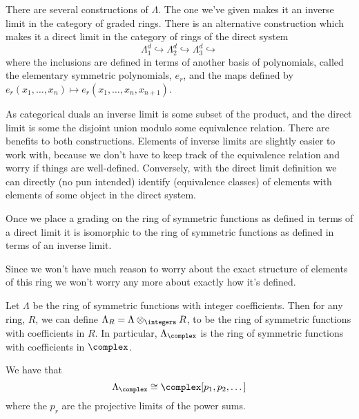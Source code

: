 \documentclass[fleqn]{NotesClass}
\newcommand{\isomorphic}{\cong}
\begin{document}
    \begin{remark}{}{}
        There are several constructions of \(\Lambda\).
        The one we've given makes it an inverse limit in the category of graded rings.
        There is an alternative construction which makes it a direct limit in the category of rings of the direct system
        \begin{equation}
            \Lambda_1^d \hookrightarrow \Lambda_2^d \hookrightarrow \Lambda_3^d \hookrightarrow
        \end{equation}
        where the inclusions are defined in terms of another basis of polynomials, called the elementary symmetric polynomials, \(e_r\), and the maps defined by \(e_r(x_1, \dotsc, x_n) \mapsto e_r(x_1, \dotsc, x_n, x_{n+1})\).
        
        As categorical duals an inverse limit is some subset of the product, and the direct limit is some the disjoint union modulo some equivalence relation.
        There are benefits to both constructions.
        Elements of inverse limits are slightly easier to work with, because we don't have to keep track of the equivalence relation and worry if things are well-defined.
        Conversely, with the direct limit definition we can directly (no pun intended) identify (equivalence classes) of elements with elements of some object in the direct system.
        
        Once we place a grading on the ring of symmetric functions as defined in terms of a direct limit it is isomorphic to the ring of symmetric functions as defined in terms of an inverse limit.
        
        Since we won't have much reason to worry about the exact structure of elements of this ring we won't worry any more about exactly how it's defined.
    \end{remark}
    
    Let \(\Lambda\) be the ring of symmetric functions with integer coefficients.
    Then for any ring, \(R\), we can define \(\Lambda_R = \Lambda \otimes_{\integers} R\), to be the ring of symmetric functions with coefficients in \(R\).
    In particular, \(\Lambda_{\complex}\) is the ring of symmetric functions with coefficients in \(\complex\).
    
    \begin{prp}{}{}
        We have that
        \begin{equation}
            \Lambda_{\complex} \isomorphic \complex[p_1, p_2, \dotsc]
        \end{equation}
        where the \(p_r\) are the projective limits of the power sums.
    \end{prp}
    
\end{document}

